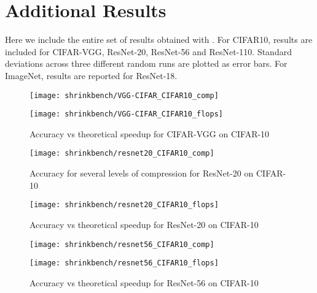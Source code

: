 
\section{Additional Results} \label{apx:res}


Here we include the entire set of results obtained with \SB.
%
For CIFAR10, results are included for CIFAR-VGG, ResNet-20, ResNet-56 and ResNet-110. Standard deviations across three different random runs are plotted as error bars.
%
For ImageNet, results are reported for ResNet-18.

\clearpage

\begin{figure*}
\begin{minipage}[b]{.45\textwidth}
\centering
\texttt{[image: shrinkbench/VGG-CIFAR\_CIFAR10\_comp]}
\end{minipage}
\hfill
\begin{minipage}[b]{.45\textwidth}
\centering
\texttt{[image: shrinkbench/VGG-CIFAR\_CIFAR10\_flops]}
\caption{Accuracy vs theoretical speedup for CIFAR-VGG on CIFAR-10}
\end{minipage}
\end{figure*}


\begin{figure*}
\begin{minipage}[b]{.45\textwidth}
\centering
\texttt{[image: shrinkbench/resnet20\_CIFAR10\_comp]}
\caption{Accuracy for several levels of compression for ResNet-20 on CIFAR-10}
\end{minipage}
\hfill
\begin{minipage}[b]{.45\textwidth}
\centering
\texttt{[image: shrinkbench/resnet20\_CIFAR10\_flops]}
\caption{Accuracy vs theoretical speedup for ResNet-20 on CIFAR-10}
\end{minipage}
\end{figure*}

\begin{figure*}
\begin{minipage}[b]{.45\textwidth}
\centering
\texttt{[image: shrinkbench/resnet56\_CIFAR10\_comp]}
\end{minipage}
\hfill
\begin{minipage}[b]{.45\textwidth}
\centering
\texttt{[image: shrinkbench/resnet56\_CIFAR10\_flops]}
\caption{Accuracy vs theoretical speedup for ResNet-56 on CIFAR-10}
\end{minipage}
\end{figure*}


